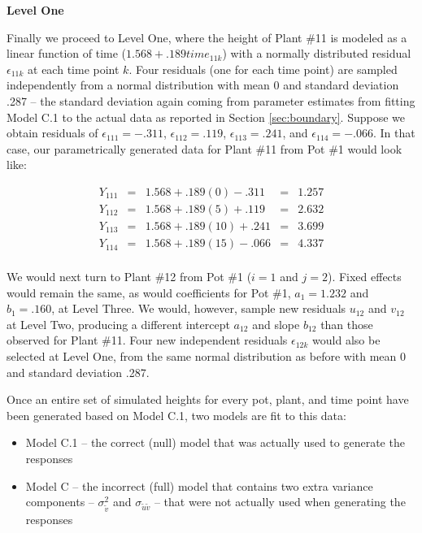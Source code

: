 \documentclass[
]{krantz}
\providecommand{\tightlist}{%
  \setlength{\itemsep}{0pt}\setlength{\parskip}{0pt}}
\begin{document}
\textbf{Level One}

Finally we proceed to Level One, where the height of Plant \#11 is modeled as a linear function of time (\(1.568 + .189\textstyle{time}_{11k}\)) with a normally distributed residual \(\epsilon_{11k}\) at each time point \(k\). Four residuals (one for each time point) are sampled independently from a normal distribution with mean 0 and standard deviation .287 -- the standard deviation again coming from parameter estimates from fitting Model C.1 to the actual data as reported in Section \ref{sec:boundary}. Suppose we obtain residuals of \(\epsilon_{111}=-.311\), \(\epsilon_{112}=.119\), \(\epsilon_{113}=.241\), and \(\epsilon_{114}=-.066\). In that case, our parametrically generated data for Plant \#11 from Pot \#1 would look like:

\[ \begin{array}{rcccl}
   Y_{111} & = & 1.568+.189(0)-.311 & = & 1.257 \\
   Y_{112} & = & 1.568+.189(5)+.119 & = & 2.632 \\
   Y_{113} & = & 1.568+.189(10)+.241 & = & 3.699 \\
   Y_{114} & = & 1.568+.189(15)-.066 & = & 4.337 \\
   \end{array} \]

We would next turn to Plant \#12 from Pot \#1 (\(i=1\) and \(j=2\)). Fixed effects would remain the same, as would coefficients for Pot \#1, \(a_{1} = 1.232\) and \(b_{1} = .160\), at Level Three. We would, however, sample new residuals \(u_{12}\) and \(v_{12}\) at Level Two, producing a different intercept \(a_{12}\) and slope \(b_{12}\) than those observed for Plant \#11. Four new independent residuals \(\epsilon_{12k}\) would also be selected at Level One, from the same normal distribution as before with mean 0 and standard deviation .287.

Once an entire set of simulated heights for every pot, plant, and time point have been generated based on Model C.1, two models are fit to this data:

\begin{itemize}
\tightlist
\item
  Model C.1 -- the correct (null) model that was actually used to generate the responses
\item
  Model C -- the incorrect (full) model that contains two extra variance components -- \(\sigma_{\tilde{v}}^{2}\) and \(\sigma_{\tilde{u}\tilde{v}}\) -- that were not actually used when generating the responses
\end{itemize}
\end{document}
